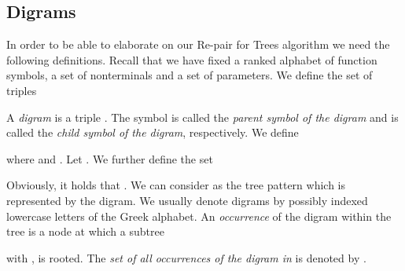 \documentclass[12pt]{llncs}
\newcommand{\tp}{digram\xspace}
\newcommand{\tps}{digrams\xspace}
\begin{document}
\subsection{Digrams}

In order to be able to elaborate on our Re-pair for Trees algorithm we need the following definitions. Recall that we have fixed a ranked alphabet  of function symbols, a set  of nonterminals and a set  of parameters. We define the set of triples

A \emph{\tp} is a triple . The symbol  is called the \emph{parent symbol of the \tp } and  is called the \emph{child symbol of the \tp }, respectively. We define

where  and . Let . We further define the set

Obviously, it holds that .
We can consider  as the tree pattern which is represented by the \tp . We usually denote \tps by possibly indexed lowercase letters  of the Greek alphabet.
An \emph{occurrence} of the \tp  within the tree 
 is a node  at which a subtree
	
with , is rooted. 
The \emph{set of all occurrences of the \tp  in } is denoted by 
.
\end{document}
